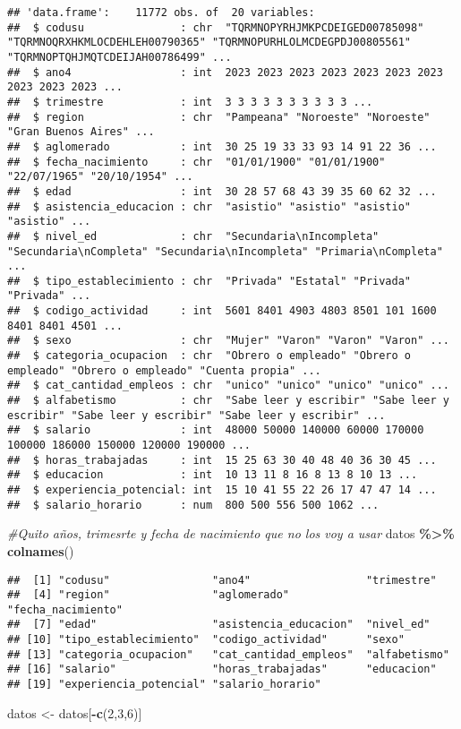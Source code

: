 \documentclass[
]{article}
\newenvironment{Shaded}{\begin{snugshade}}{\end{snugshade}}
\newcommand{\CommentTok}[1]{\textcolor[rgb]{0.56,0.35,0.01}{\textit{#1}}}
\newcommand{\DecValTok}[1]{\textcolor[rgb]{0.00,0.00,0.81}{#1}}
\newcommand{\FunctionTok}[1]{\textcolor[rgb]{0.13,0.29,0.53}{\textbf{#1}}}
\newcommand{\NormalTok}[1]{#1}
\newcommand{\OtherTok}[1]{\textcolor[rgb]{0.56,0.35,0.01}{#1}}
\newcommand{\SpecialCharTok}[1]{\textcolor[rgb]{0.81,0.36,0.00}{\textbf{#1}}}
\begin{document}
\begin{verbatim}
## 'data.frame':    11772 obs. of  20 variables:
##  $ codusu               : chr  "TQRMNOPYRHJMKPCDEIGED00785098" "TQRMNOQRXHKMLOCDEHLEH00790365" "TQRMNOPURHLOLMCDEGPDJ00805561" "TQRMNOPTQHJMQTCDEIJAH00786499" ...
##  $ ano4                 : int  2023 2023 2023 2023 2023 2023 2023 2023 2023 2023 ...
##  $ trimestre            : int  3 3 3 3 3 3 3 3 3 3 ...
##  $ region               : chr  "Pampeana" "Noroeste" "Noroeste" "Gran Buenos Aires" ...
##  $ aglomerado           : int  30 25 19 33 33 93 14 91 22 36 ...
##  $ fecha_nacimiento     : chr  "01/01/1900" "01/01/1900" "22/07/1965" "20/10/1954" ...
##  $ edad                 : int  30 28 57 68 43 39 35 60 62 32 ...
##  $ asistencia_educacion : chr  "asistio" "asistio" "asistio" "asistio" ...
##  $ nivel_ed             : chr  "Secundaria\nIncompleta" "Secundaria\nCompleta" "Secundaria\nIncompleta" "Primaria\nCompleta" ...
##  $ tipo_establecimiento : chr  "Privada" "Estatal" "Privada" "Privada" ...
##  $ codigo_actividad     : int  5601 8401 4903 4803 8501 101 1600 8401 8401 4501 ...
##  $ sexo                 : chr  "Mujer" "Varon" "Varon" "Varon" ...
##  $ categoria_ocupacion  : chr  "Obrero o empleado" "Obrero o empleado" "Obrero o empleado" "Cuenta propia" ...
##  $ cat_cantidad_empleos : chr  "unico" "unico" "unico" "unico" ...
##  $ alfabetismo          : chr  "Sabe leer y escribir" "Sabe leer y escribir" "Sabe leer y escribir" "Sabe leer y escribir" ...
##  $ salario              : int  48000 50000 140000 60000 170000 100000 186000 150000 120000 190000 ...
##  $ horas_trabajadas     : int  15 25 63 30 40 48 40 36 30 45 ...
##  $ educacion            : int  10 13 11 8 16 8 13 8 10 13 ...
##  $ experiencia_potencial: int  15 10 41 55 22 26 17 47 47 14 ...
##  $ salario_horario      : num  800 500 556 500 1062 ...
\end{verbatim}

\begin{Shaded}
\begin{Highlighting}[]
\CommentTok{\#Quito años, trimesrte y fecha de nacimiento que no los voy a usar}
\NormalTok{datos }\SpecialCharTok{\%\textgreater{}\%} \FunctionTok{colnames}\NormalTok{()}
\end{Highlighting}
\end{Shaded}

\begin{verbatim}
##  [1] "codusu"                "ano4"                  "trimestre"            
##  [4] "region"                "aglomerado"            "fecha_nacimiento"     
##  [7] "edad"                  "asistencia_educacion"  "nivel_ed"             
## [10] "tipo_establecimiento"  "codigo_actividad"      "sexo"                 
## [13] "categoria_ocupacion"   "cat_cantidad_empleos"  "alfabetismo"          
## [16] "salario"               "horas_trabajadas"      "educacion"            
## [19] "experiencia_potencial" "salario_horario"
\end{verbatim}

\begin{Shaded}
\begin{Highlighting}[]
\NormalTok{datos }\OtherTok{\textless{}{-}}\NormalTok{ datos[}\SpecialCharTok{{-}}\FunctionTok{c}\NormalTok{(}\DecValTok{2}\NormalTok{,}\DecValTok{3}\NormalTok{,}\DecValTok{6}\NormalTok{)]}
\end{Highlighting}
\end{Shaded}
\end{document}
